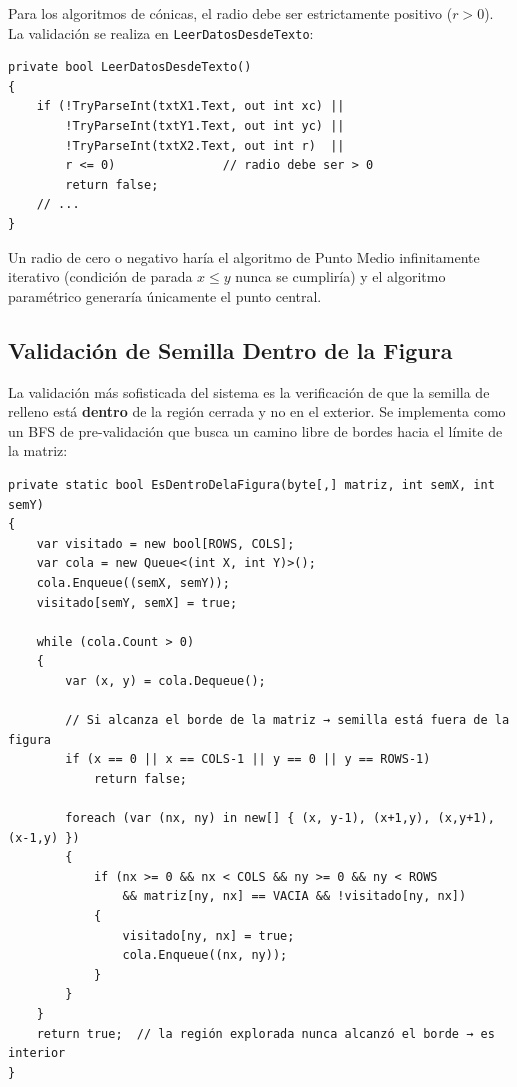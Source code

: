 \documentclass[
  spanish,
  a4paper,
  12pt,
]{article}
\newcommand{\passthrough}[1]{#1}
\begin{document}
Para los algoritmos de cónicas, el radio debe ser estrictamente positivo
(\(r > 0\)). La validación se realiza en
\passthrough{\lstinline!LeerDatosDesdeTexto!}:

\begin{lstlisting}
private bool LeerDatosDesdeTexto()
{
    if (!TryParseInt(txtX1.Text, out int xc) ||
        !TryParseInt(txtY1.Text, out int yc) ||
        !TryParseInt(txtX2.Text, out int r)  ||
        r <= 0)               // radio debe ser > 0
        return false;
    // ...
}
\end{lstlisting}

Un radio de cero o negativo haría el algoritmo de Punto Medio
infinitamente iterativo (condición de parada \(x \leq y\) nunca se
cumpliría) y el algoritmo paramétrico generaría únicamente el punto
central.

\subsection{Validación de Semilla Dentro de la
Figura}\label{validaciuxf3n-de-semilla-dentro-de-la-figura}

La validación más sofisticada del sistema es la verificación de que la
semilla de relleno está \textbf{dentro} de la región cerrada y no en el
exterior. Se implementa como un BFS de pre-validación que busca un
camino libre de bordes hacia el límite de la matriz:

\begin{lstlisting}
private static bool EsDentroDelaFigura(byte[,] matriz, int semX, int semY)
{
    var visitado = new bool[ROWS, COLS];
    var cola = new Queue<(int X, int Y)>();
    cola.Enqueue((semX, semY));
    visitado[semY, semX] = true;

    while (cola.Count > 0)
    {
        var (x, y) = cola.Dequeue();

        // Si alcanza el borde de la matriz → semilla está fuera de la figura
        if (x == 0 || x == COLS-1 || y == 0 || y == ROWS-1)
            return false;

        foreach (var (nx, ny) in new[] { (x, y-1), (x+1,y), (x,y+1), (x-1,y) })
        {
            if (nx >= 0 && nx < COLS && ny >= 0 && ny < ROWS
                && matriz[ny, nx] == VACIA && !visitado[ny, nx])
            {
                visitado[ny, nx] = true;
                cola.Enqueue((nx, ny));
            }
        }
    }
    return true;  // la región explorada nunca alcanzó el borde → es interior
}
\end{lstlisting}
\end{document}
